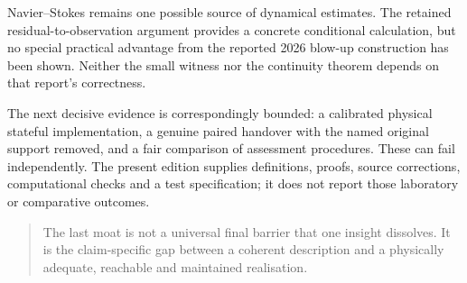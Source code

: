 \documentclass[11pt,a4paper]{article}
\theoremstyle{definition}
\theoremstyle{remark}
\begin{document}
Navier--Stokes remains one possible source of dynamical estimates. The retained residual-to-observation argument provides a concrete conditional calculation, but no special practical advantage from the reported 2026 blow-up construction has been shown. Neither the small witness nor the continuity theorem depends on that report's correctness.

The next decisive evidence is correspondingly bounded: a calibrated physical stateful implementation, a genuine paired handover with the named original support removed, and a fair comparison of assessment procedures. These can fail independently. The present edition supplies definitions, proofs, source corrections, computational checks and a test specification; it does not report those laboratory or comparative outcomes.
\begin{quote}
The last moat is not a universal final barrier that one insight dissolves. It is the claim-specific gap between a coherent description and a physically adequate, reachable and maintained realisation.
\end{quote}

\appendix
\end{document}
